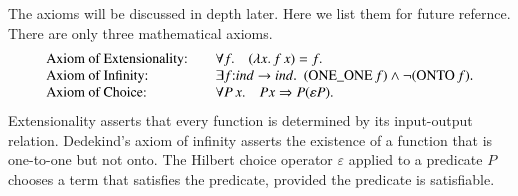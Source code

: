 \documentclass[cup9a]{cupbook}
\def\tc{\hbox{:}}
\begin{document}
The axioms will be discussed in depth later.  Here we list them for future refernce.  There are only three mathematical axioms.
$$\begin{array}{lll}
\hbox{Axiom of Extensionality:} &\quad\forall f.\hskip1em(\lambda x.\, f\, x) = f.\\
\hbox{Axiom of Infinity:} &\quad\exists f\tc ind\to ind.~~(\op{ONE\_ONE}\,f) \land \neg(\op{ONTO}\, f).\\
\hbox{Axiom of Choice:}&\quad  
\forall P\,x.\hskip1em P x \Rightarrow  P(\varepsilon P).\\
\end{array}
$$
Extensionality asserts that every function is determined by its input-output relation. Dedekind's axiom of infinity asserts the existence of a function that is one-to-one but not onto.  The Hilbert choice operator $\varepsilon$ applied to a predicate $P$ chooses a term that satisfies the predicate, provided the
predicate is satisfiable.
\end{document}

